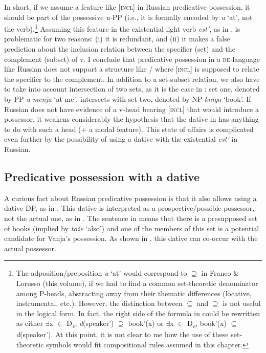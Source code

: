 \documentclass[output=paper,colorlinks,citecolor=brown,nonflat]{./langscibook}
\begin{document}
In short, if we assume a feature like [\textsc{incl}] in Russian predicative possession, it should be part of the possessive \textit{u-}PP (i.e., it is formally encoded by \textit{u} ‘at’, not the verb).\footnote{The adposition/preposition \textit{u} ‘at’ would correspond to \textrm{${\supseteq}$} in Franco \& Lorusso (this volume), if we had to find a common set-theoretic denominator among P-heads, abstracting away from their thematic differences (locative, instrumental, etc.). However, the distinction between \textrm{${\subseteq}$} and \textrm{${\supseteq}$} is not useful in the logical form. In fact, the right side of the formula in  could be rewritten as either \textrm{${\exists}$}x \textrm{${\in}$} D\textit{\textsubscript{e}}, \textit{d}(speaker\textrm{'}) \textrm{${\supseteq}$} book\textrm{'}(x) or \textrm{${\exists}$}x \textrm{${\in}$} D\textit{\textsubscript{e}}, book\textrm{'}(x) \textrm{${\subseteq}$} \textit{d}(speaker\textrm{'}). At this point, it is not clear to me how the use of these set-theoretic symbols would fit compositional rules assumed in this chapter.}  Assuming this feature in the existential light verb \textit{est’}, as in , is problematic for two reasons: (i) it is redundant, and (ii) it makes a false prediction about the inclusion relation between the specifier (set) and the complement (subset) of v. I conclude that predicative possession in a \textsc{be}{}-language like Russian does not support a structure like / where [\textsc{incl}] is supposed to relate the specifier to the complement. In addition to a set-subset relation, we also have to take into account intersection of two sets, as it is the case in : set one, denoted by PP \textit{u menja} ‘at me’, intersects with set two, denoted by NP \textit{kniga} ‘book’. If Russian does not have evidence of a v-head bearing [\textsc{incl}] that would introduce a possessor, it weakens considerably the hypothesis that the dative in  has anything to do with such a head (+ a modal feature). This state of affairs is complicated even further by the possibility of using a dative with the existential \textit{est’} in Russian.

\subsection{Predicative possession with a dative}\label{sec:tsedryk:2.3}

A curious fact about Russian predicative possession is that it also allows using a dative DP, as in . This dative is interpreted as a prospective/possible possessor, not the actual one, as in . The sentence in  means that there is a presupposed set of books (implied by \textit{tože} ‘also’) and one of the members of this set is a potential candidate for Vanja’s possession. As shown in , this dative can co-occur with the actual possessor. 
\end{document}
